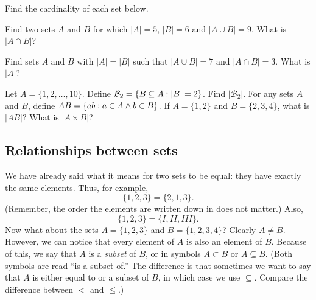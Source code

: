 \documentclass[12pt]{article}
\begin{document}
\begin{activity}
\begin{questions}
\question Find the cardinality of each set below.

\question Find two sets $A$ and $B$ for which $|A| = 5$, $|B| = 6$ and $|A\cup B| = 9$.  What is $|A \cap B|$? 

\question Find sets $A$ and $B$ with $|A| = |B|$ such that $|A\cup B| = 7$ and $|A \cap B| = 3$.  What is $|A|$?

\question Let $A = \{1,2,\ldots, 10\}$.  Define $\mathcal{B}_2 = \{B \subseteq A : |B| = 2\}$.  Find $|\mathcal{B}_2|$.
\question For any sets $A$ and $B$, define $AB = \{ab : a\in A \wedge b \in B\}$.  If $A = \{1,2\}$ and $B = \{2,3,4\}$, what is $|AB|$?  What is $|A \times B|$?
\end{questions}
\end{activity}



\subsection{Relationships between sets}

We have already said what it means for two sets to be equal: they have exactly the same elements.  Thus, for example,
\[ \{1, 2, 3\} = \{2, 1, 3\}.\]
(Remember, the order the elements are written down in does not matter.)  Also,
\[ \{1, 2, 3\} = \{I, II, III\}.\]
Now what about the sets $A = \{1, 2, 3\}$ and $B = \{1, 2, 3, 4\}$?  Clearly $A \ne B$.  However, we can notice that every element of $A$ is also an element of $B$.  Because of this, we say that $A$ is a \emph{subset} of $B$, or in symbols $A \subset B$ or $A \subseteq B$.  (Both symbols are read ``is a subset of.'' The difference is that sometimes we want to say that $A$ is either equal to or a subset of $B$, in which case we use $\subseteq$.  Compare the difference between $<$ and $\le$.)
\end{document}

